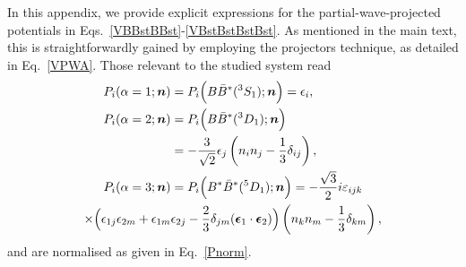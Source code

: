 \documentclass[aps,prd,showpacs,amsmath,twocolumn,superscriptaddress,floatfix,nofootinbib,notitlepage]{revtex4-2}
\newcommand{\ven}{{\bm n}}
\newcommand{\veep}{{\bm \epsilon}}
\begin{document}
In this appendix, we provide explicit expressions for the partial-wave-projected potentials in Eqs.~\eqref{VBBstBBst}-\eqref{VBstBstBstBst}. As mentioned in the main text, this is straightforwardly gained by employing the projectors technique, as detailed in Eq.~\eqref{VPWA}. Those relevant to the studied system read
\begin{align}
P_i(\alpha=1;\ven)&=P_i\Bigl(B\bar{B}^*(^3S_1);\ven\Bigr)=\epsilon_i,\notag\\
P_i(\alpha=2;\ven)&=P_i\Bigl(B\bar{B}^*(^3D_1);\ven\Bigr)\notag\\
&=-\frac{3}{\sqrt{2}}\epsilon_j \left( n_i n_j-\frac13\delta_{ij}\right),
\label{projectors}\\
P_i(\alpha=3;\ven)&=P_i\Bigl(B^*\bar{B}^*(^5D_1);\ven\Bigr)=-\frac{\sqrt{3}}{2} i \varepsilon_{ijk}\notag\\
\times\Bigl(\epsilon_{1j}\epsilon_{2m}+\epsilon_{1m}&\epsilon_{2j}-\frac23\delta_{jm}(\veep_1\cdot\veep_2)\Bigr)
\left(n_k n_m-\frac13\delta_{km}\right),\notag
\end{align}
and are normalised as given in Eq.~\eqref{Pnorm}.
\end{document}
